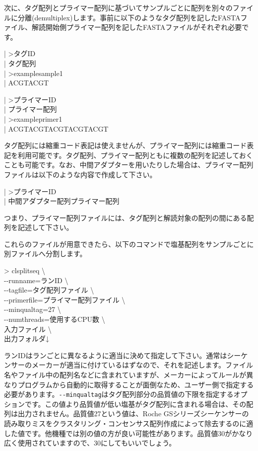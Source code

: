 \documentclass[titlepage,10pt,a4paper]{jsbook}
\newenvironment{content}{\begin{shaded}\vspace{-1em}\raggedright\ttfamily\footnotesize\setlength{\baselineskip}{1.4em}}{\end{shaded}\vspace{-1em}}
\newenvironment{cmd}{\begin{oframed}\raggedright\ttfamily\footnotesize\setlength{\baselineskip}{1.4em}}{\end{oframed}\vspace{-1em}}
\begin{document}
次に、タグ配列とプライマー配列に基づいてサンプルごとに配列を別々のファイルに分離(demultiplex)します。事前に以下のようなタグ配列を記したFASTAファイル、解読開始側プライマー配列を記したFASTAファイルがそれぞれ必要です。
\begin{content}
| {\textgreater}タグID\\
| タグ配列\\
| {\textgreater}examplesample1\\
| ACGTACGT
\end{content}
\begin{content}
| {\textgreater}プライマーID\\
| プライマー配列\\
| {\textgreater}exampleprimer1\\
| ACGTACGTACGTACGTACGT
\end{content}
タグ配列には縮重コード表記は使えませんが、プライマー配列には縮重コード表記を利用可能です。タグ配列、プライマー配列ともに複数の配列を記述しておくことも可能です。なお、中間アダプターを用いたりした場合は、プライマー配列ファイルは以下のような内容で作成して下さい。
\begin{content}
| {\textgreater}プライマーID\\
| 中間アダプター配列プライマー配列
\end{content}
つまり、プライマー配列ファイルには、タグ配列と解読対象の配列の間にある配列を記述して下さい。

これらのファイルが用意できたら、以下のコマンドで塩基配列をサンプルごとに別ファイルへ分割します。
\begin{cmd}
{\textgreater} clsplitseq {\textbackslash}\\
{-}{-}runname=ランID {\textbackslash}\\
{-}{-}tagfile=タグ配列ファイル {\textbackslash}\\
{-}{-}primerfile=プライマー配列ファイル {\textbackslash}\\
{-}{-}minqualtag=27 {\textbackslash}\\
{-}{-}numthreads=使用するCPU数 {\textbackslash}\\
入力ファイル {\textbackslash}\\
出力フォルダ↓
\end{cmd}
ランIDはランごとに異なるように適当に決めて指定して下さい。通常はシーケンサーのメーカーが適当に付けているはずなので、それを記述します。ファイル名やファイル中の配列名などに含まれていますが、メーカーによってルールが異なりプログラムから自動的に取得することが面倒なため、ユーザー側で指定する必要があります。\texttt{{-}{-}minqualtag}はタグ配列部分の品質値の下限を指定するオプションです。この値より品質値が低い塩基がタグ配列に含まれる場合は、その配列は出力されません。品質値27という値は、Roche GSシリーズシーケンサーの読み取りミスをクラスタリング・コンセンサス配列作成によって除去するのに適した値です\citep{Kunin2010}。他機種では別の値の方が良い可能性があります。品質値30がかなり広く使用されていますので、30にしてもいいでしょう。
\end{document}
